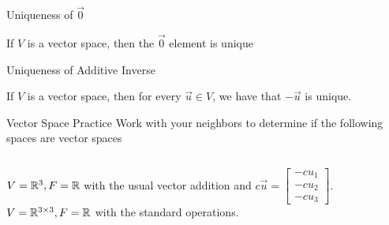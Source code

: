 \documentclass[xcoler=dvipsnames, aspectratio=169]{beamer}
\begin{document}
    \begin{frame}{Uniqueness of $\vec{0}$}
        \begin{theorem} 
            If $V$ is a vector space, then the $\vec{0}$ element is unique
        \end{theorem}
        \iftoggle{showSolutions}{
            \pause
            \begin{proof}
                Let $\vec{w}\in V$ such that for every $\vec{u}\in V$ we have
                \[
                    \vec{w}+\vec{u} = \vec{u}+\vec{w} = \vec{u} 
                \]\pause
                By taking $\vec{u}=\vec{0}$, we have:\pause
                \begin{eqnarray*}
                    \vec{0}+\vec{w} &=& \vec{0}\pause\\
                    \vec{w}+\vec{0} &=& \vec{w}\pause
                \end{eqnarray*}
                Thus, we see that $\vec{w} = \vec{0}$
            \end{proof}
        }{\vspace{130pt}}
    \end{frame}
    \begin{frame}{Uniqueness of Additive Inverse}
        \begin{theorem}
            If $V$ is a vector space, then for every $\vec{u}\in V$, we have that
            $-\vec{u}$ is unique.
        \end{theorem}
        \iftoggle{showSolutions}{
            \pause
            \begin{proof}
                Let $\vec{u}\in V$, and suppose there are two additive identities IE that
                $-\vec{u}_1,-\vec{u}_2\in V$ such that $\vec{u}+(-\vec{u}_1) = \vec{0} =
                \vec{u} + (-\vec{u}_2)$ See that\pause
                \[
                    \vec{u} + (-\vec{u}_1) = 0\rightarrow -\vec{u}_2 + (\vec{u} + (-\vec{u}_1)) = -\vec{u}_2\pause\rightarrow (-\vec{u}_2 + \vec{u})+ -\vec{u}_1 = -\vec{u}_2
                \]
                \[
                    \pause\rightarrow -\vec{u}_1 = -\vec{u}_2
                \]
            \end{proof}
        }{\vspace{130pt}}
    \end{frame}
    \begin{frame}{Vector Space Practice}
        Work with your neighbors to determine if the following spaces are vector spaces
        \begin{columns}
            $V = \mathbb{R}^3,F=\mathbb{R}$ with the usual vector addition and  $c\vec{u} = \begin{bmatrix}
                -cu_1\\-cu_2\\-cu_3
            \end{bmatrix}$.
            $V = \mathbb{R}^{3\times 3},F=\mathbb{R}$  with the standard operations.
        \end{columns}
        \vspace{130pt}
    \end{frame}
\end{document}
